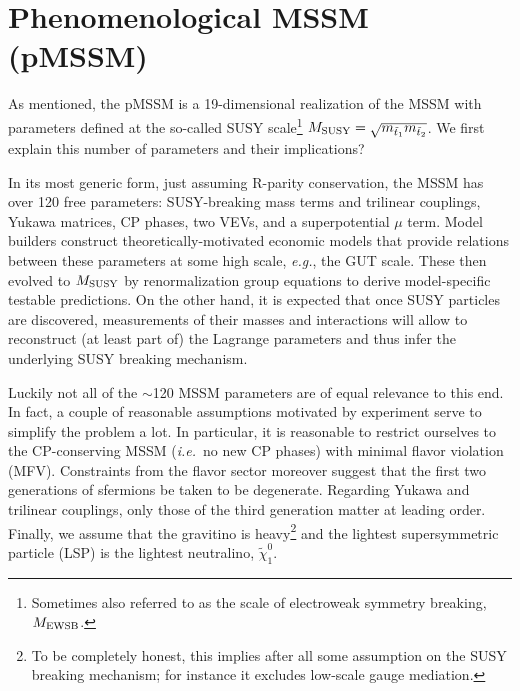 \section{Phenomenological MSSM (pMSSM)}
\label{sec:model}

As mentioned, the pMSSM is a 19-dimensional realization of the MSSM 
with parameters defined at the so-called SUSY scale\footnote{Sometimes 
also referred to as the scale of electroweak symmetry breaking, $M_{\rm EWSB}$.} 
$M_{\rm SUSY}=\sqrt{m_{\tilde t_1}m_{\tilde t_2}}$. We first explain
this number of parameters and their implications?

In its most generic form, just assuming R-parity conservation, 
the MSSM has over 120 free parameters: 
SUSY-breaking mass terms and trilinear couplings, Yukawa matrices, 
CP phases, two VEVs, and a superpotential $\mu$ term. 
Model builders construct theoretically-motivated economic models 
that provide relations between these parameters at some high scale, 
{\it e.g.}, the GUT scale. 
These then evolved to $M_{\rm SUSY}$ by renormalization group equations 
to derive model-specific testable predictions. On the other 
hand, it is expected that once SUSY particles are discovered, measurements 
of their masses and interactions will allow to reconstruct (at least 
part of) the Lagrange parameters and thus infer the underlying SUSY 
breaking mechanism.
 
Luckily not all of the $\sim$120 MSSM parameters are of equal relevance to this end.
In fact, a couple of reasonable assumptions motivated by experiment serve to 
simplify the problem a lot. In particular, it is reasonable to restrict ourselves 
to the CP-conserving MSSM ({\it i.e.}\ no new CP phases) with minimal flavor violation (MFV).  
Constraints from the flavor sector moreover suggest that the first two generations 
of sfermions be taken to be degenerate. Regarding Yukawa and trilinear couplings, 
only those of the third generation matter at leading order. 
Finally, we assume that the gravitino is heavy\footnote{To be completely honest, 
this implies after all some assumption on the SUSY breaking mechanism; for instance it 
excludes low-scale gauge mediation.} and the lightest supersymmetric 
particle (LSP) is the lightest neutralino, $\tilde\chi^0_1$.
 
